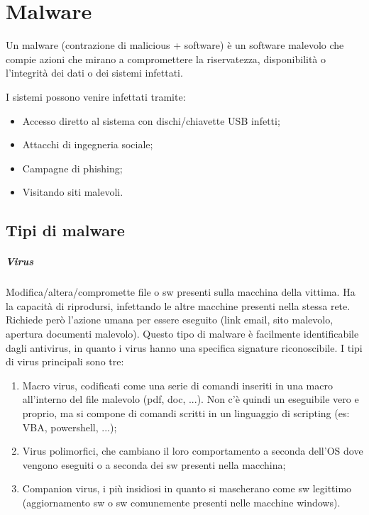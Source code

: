 \chapter{Malware}

Un malware (contrazione di malicious + software) è un software malevolo che compie azioni che mirano a compromettere la riservatezza, disponibilità o l'integrità dei dati o dei sistemi infettati.

I sistemi possono venire infettati tramite:
\begin{itemize}
    \item Accesso diretto al sistema con dischi/chiavette USB infetti;
    \item Attacchi di ingegneria sociale;
    \item Campagne di phishing;
    \item Visitando siti malevoli.
\end{itemize}

\section{Tipi di malware}
\paragraph{Virus} Modifica/altera/compromette file o sw presenti sulla macchina della vittima. Ha la capacità di riprodursi, infettando le altre macchine presenti nella stessa rete. Richiede però l'azione umana per essere eseguito (link email, sito malevolo, apertura documenti malevolo). Questo tipo di malware è facilmente identificabile dagli antivirus, in quanto i virus hanno una specifica signature riconoscibile. I tipi di virus principali sono tre:
\begin{enumerate}
    \item Macro virus, codificati come una serie di comandi inseriti in una macro all'interno del file malevolo (pdf, doc, ...). Non c'è quindi un eseguibile vero e proprio, ma si compone di comandi scritti in un linguaggio di scripting (es: VBA, powershell, ...);
	\item Virus polimorfici, che cambiano il loro comportamento a seconda dell'OS dove vengono eseguiti o a seconda dei sw presenti nella macchina;
	\item Companion virus, i più insidiosi in quanto si mascherano come sw legittimo (aggiornamento sw o sw comunemente presenti nelle macchine windows).
\end{enumerate}

